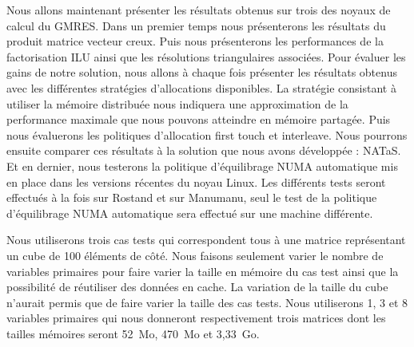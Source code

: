 Nous allons maintenant présenter les résultats obtenus sur trois des noyaux de calcul du GMRES.
%
Dans un premier temps nous présenterons les résultats du produit matrice vecteur creux.
%
Puis nous présenterons les performances de la factorisation ILU ainsi que les résolutions triangulaires associées.
%
Pour évaluer les gains de notre solution, nous allons à chaque fois présenter les résultats obtenus avec les différentes stratégies d'allocations disponibles.
%
La stratégie consistant à utiliser la mémoire distribuée nous indiquera une approximation de la performance maximale que nous pouvons atteindre en mémoire partagée.
%
Puis nous évaluerons les politiques d'allocation first touch et interleave.
%
Nous pourrons ensuite comparer ces résultats à la solution que nous avons développée : NATaS.
%
Et en dernier, nous testerons la politique d'équilibrage NUMA automatique mis en place dans les versions récentes du noyau Linux.
%
Les différents tests seront effectués à la fois sur Rostand et sur Manumanu, seul le test de la politique d'équilibrage NUMA automatique sera effectué sur une machine différente.

Nous utiliserons trois cas tests qui correspondent tous à une matrice représentant un cube de 100 éléments de côté.
%
Nous faisons seulement varier le nombre de variables primaires pour faire varier la taille en mémoire du cas test ainsi que la possibilité de réutiliser des données en cache.
%
La variation de la taille du cube n'aurait permis que de faire varier la taille des cas tests.
%
Nous utiliserons 1, 3 et 8 variables primaires qui nous donneront respectivement trois matrices dont les tailles mémoires seront 52~Mo, 470~Mo et 3,33~Go.
